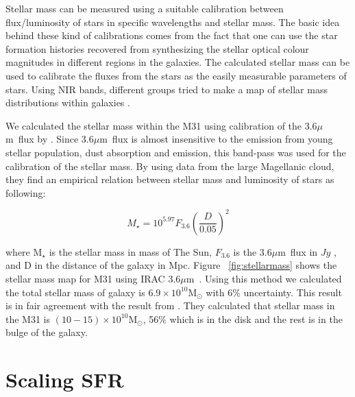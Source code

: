 \documentclass[useAMS,usenatbib]{mn2e}
\newcommand \um    {$\mu$m\ }
\begin{document}
Stellar mass can be measured using a suitable calibration between flux/luminosity of stars in specific wavelengths and stellar mass. The basic idea behind these kind of calibrations comes from the fact that one can use the star formation histories recovered from synthesizing the stellar optical colour magnitudes in different regions in the galaxies. The calculated stellar mass can be used  to calibrate the fluxes from the stars as the easily measurable parameters of stars. Using NIR bands, different groups tried to make a map of stellar mass distributions within galaxies \citep[e.g.,][]{Elmgreen84}.%

We calculated the stellar mass within the M31 using calibration of the 3.6\um flux by \cite{Eskew12}.  Since 3.6\um flux is almost insensitive to the emission from young stellar population, dust absorption and emission, this band-pass was used for the calibration of the stellar mass. By using data from the large Magellanic cloud, they find an empirical relation between stellar mass and luminosity of stars as following:

\begin{equation}
\label{equ:eskew}
M _{\star}= 10^{5.97} F_{3.6}(\frac{D}{0.05})^2
\end{equation}

where M$_{\star}$ is the stellar mass in mass of The Sun, $F_{3.6}$ is the 3.6\um flux in $Jy$ , and D in the distance of the galaxy in Mpc. Figure ~\ref{fig:stellarmass} shows the stellar mass map for M31 using IRAC 3.6\um. Using this method we calculated the total stellar mass of galaxy is $6.9 \times 10^{10}$M$_{\odot}$ with 6$\%$ uncertainty. This result is in fair agreement with the result from \cite{Tamm12}. They calculated that stellar mass in the M31 is $(10-15) \times 10^{10}$M$_{\odot}$, 56$\%$ which is in the disk and the rest is in the bulge of the galaxy.   %


\section{Scaling SFR}
\end{document}
